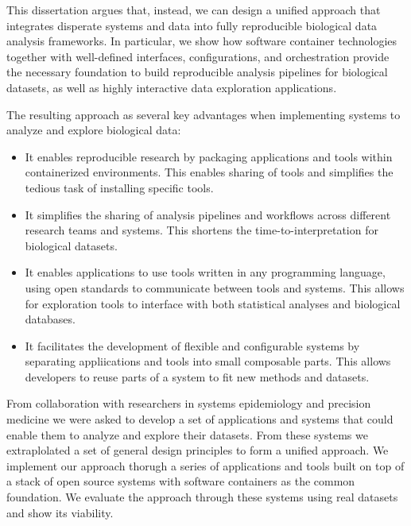 This dissertation argues that, instead, we can design a unified approach that
integrates disperate systems and data into fully reproducible biological data
analysis frameworks. In particular, we show how software container technologies
together with well-defined interfaces, configurations, and orchestration provide
the necessary foundation to build reproducible analysis pipelines for biological
datasets, as well as highly interactive data exploration applications.

The resulting approach as several key advantages when implementing systems to
analyze and explore biological data:
\begin{itemize} 
    \item It enables reproducible research by packaging applications
        and tools within containerized environments. This enables sharing of
        tools and simplifies 
        the tedious task of installing specific tools. 

    \item It simplifies the sharing of analysis pipelines and workflows across
        different research teams and systems. 
        This shortens the
        time-to-interpretation for biological datasets. 

    \item It enables applications to use tools written in any programming
        language, using open standards to communicate between tools and systems.
        This allows for exploration tools to interface with both statistical
        analyses and biological databases. %
        
    \item It facilitates the development of flexible and configurable systems by
        separating appliications and tools into small composable parts. This
        allows developers to reuse parts of a system to fit new methods and
        datasets. 
\end{itemize} 

From collaboration with researchers in systems epidemiology and precision
medicine we were asked to develop a set of applications and systems that could
enable them to analyze and explore their datasets. From these systems we
extraplolated a set of general design principles to form a unified approach. 
We implement our approach thorugh a series of applications and tools built on
top of a stack of open source systems with software containers as the common
foundation. We evaluate the approach through these systems using real datasets
and show its viability. 

